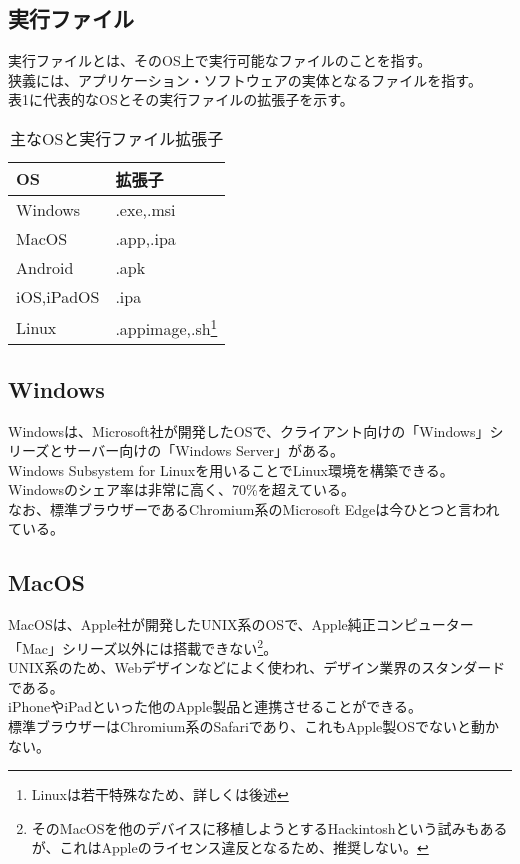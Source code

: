 \documentclass{ltjsarticle}
\begin{document}
\subsection{実行ファイル}
実行ファイルとは、そのOS上で実行可能なファイルのことを指す。\\
狭義には、アプリケーション・ソフトウェアの実体となるファイルを指す。\\
表1に代表的なOSとその実行ファイルの拡張子を示す。\\

\begin{table}
    \caption{主なOSと実行ファイル拡張子}
    \begin{center}
\begin{tabular}{|l|l|} \hline
    OS & 拡張子 \\ \hline \hline
    Windows & .exe,.msi \\ \hline
    MacOS & .app,.ipa \\ \hline
    Android & .apk \\ \hline
    iOS,iPadOS & .ipa \\ \hline
    Linux & .appimage,.sh\footnote[2]{Linuxは若干特殊なため、詳しくは後述} \\ \hline
\end{tabular}
\end{center}
\end{table}
\subsection{Windows}
Windowsは、Microsoft社が開発したOSで、クライアント向けの「Windows」シリーズとサーバー向けの「Windows Server」がある。\\
Windows Subsystem for Linuxを用いることでLinux環境を構築できる。\\
Windowsのシェア率は非常に高く、70\%を超えている。\\
なお、標準ブラウザーであるChromium系のMicrosoft Edgeは今ひとつと言われている。
\subsection{MacOS}
MacOSは、Apple社が開発したUNIX系のOSで、Apple純正コンピューター「Mac」シリーズ以外には搭載できない\footnote[3]{そのMacOSを他のデバイスに移植しようとするHackintoshという試みもあるが、これはAppleのライセンス違反となるため、推奨しない。}。\\
UNIX系のため、Webデザインなどによく使われ、デザイン業界のスタンダードである。\\
iPhoneやiPadといった他のApple製品と連携させることができる。\\
標準ブラウザーはChromium系のSafariであり、これもApple製OSでないと動かない。
\end{document}
